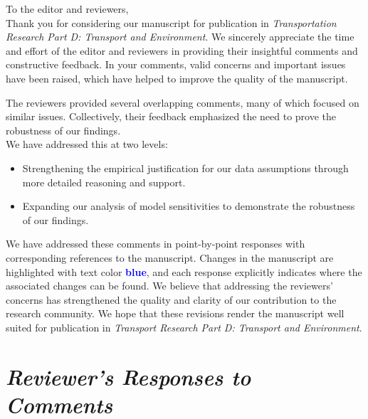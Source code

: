 \documentclass[11pt]{article}
\begin{document}
\fancyfoot[C]{\thepage}
\noindent To the editor and reviewers, \\

Thank you for considering our manuscript for publication in \textit{Transportation Research Part D: Transport and Environment}. We sincerely appreciate the time and effort of the editor and reviewers in providing their insightful comments and constructive feedback. In your comments, valid concerns and important issues have been raised, which have helped to improve the quality of the manuscript. 

The reviewers provided several overlapping comments, many of which focused on similar issues. Collectively, their feedback emphasized the need to prove the robustness of our findings.\\

\noindent We have addressed this at two levels:

\begin{itemize}
    \item Strengthening the empirical justification for our data assumptions through more detailed reasoning and support.
    \item Expanding our analysis of model sensitivities to demonstrate the robustness of our findings.
\end{itemize}

\noindent We have addressed these comments in point-by-point responses with corresponding references to the manuscript. Changes in the manuscript are highlighted with text color \textcolor{blue}{\textbf{blue}}, and each response explicitly indicates where the associated changes can be found. We believe that addressing the reviewers' concerns has strengthened the quality and clarity of our contribution to the research community.
We hope that these revisions render the manuscript well suited for publication in \textit{Transport Research Part D: Transport and Environment}.
\vspace{0.5cm}



\newpage
{}
\section*{\textit{Reviewer's Responses to Comments}}
\end{document}
